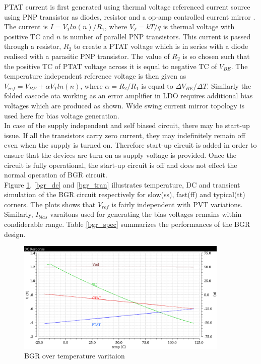 \documentclass[12pt,a4paper,UKenglish]{article}
\begin{document}
PTAT current is first generated using thermal voltage referenced current source using PNP transistor as diodes, resistor and a op-amp controlled current mirror \cite[pp. 391-392]{razavi_2001}. The current is $I = V_T ln(n)/R_1$, where $V_T = kT/q $ is thermal voltage with positive TC and $n$ is number of parallel PNP transistors. This current is passed through a resistor, $R_2$ to create a PTAT voltage which is in series with a diode realised with a parasitic PNP transistor. The value of $R_2$ is so chosen such that the positive TC of PTAT voltage across it is equal to negative TC of $V_{BE}$. The temperature independent reference voltage is then given as $V_{ref}  = V_{BE} + \alpha V_T ln(n)$, where $ \alpha = R_2/R_1$ is equal to $  \Delta V_{BE}/\Delta T$. Similarly the folded cascode  \gls{ota} working as an error amplifier in LDO requires additional bias voltages which are produced as shown. Wide swing current mirror topology is used here for bias voltage generation.\\

In case of the supply independent and self biased circuit, there may be start-up issue. If all the transistors carry zero current, they may indefinitely remain off even when the supply is turned on. Therefore start-up circuit is added in order to ensure that the devices are turn on as supply voltage is provided. Once the circuit is fully operational, the start-up circuit is off and does not effect the normal operation of BGR circuit. \\

Figure  \ref{bgr_temp}, \ref{bgr_dc} and \ref{bgr_tran} illustrates temperature, DC and transient simulation of the BGR circuit respectively for slow(ss), fast(ff) and typical(tt) corners. The plots shows that $V_{ref}$ is fairly independent with PVT variations. Similarly, $I_{bias}$ varaitons used for generating the bias voltages remains within condiderable range. Table \ref{bgr_spec} summarizes the performances of the BGR design. 

\begin{figure}[htbp] %
   \centering
   \includegraphics[width=0.9\textwidth]{img/bgr_temp.pdf} 
   \caption{BGR over temperature varitaion}
   \label{bgr_temp}
\end{figure}
\end{document}
